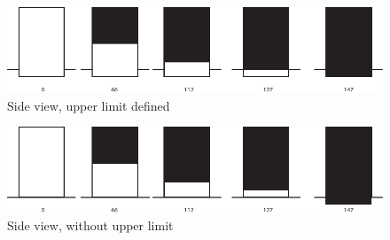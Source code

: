 \begin{figure}
\includegraphics[width=\linewidth]{./resources/Asset 7.pdf}
\caption{Side view, upper limit defined}\label{fig:Asset7}
\end{figure}

\begin{figure}
\includegraphics[width=\linewidth]{./resources/Asset 9.pdf}
\caption{Side view, without upper limit}\label{fig:Asset9}
\end{figure}